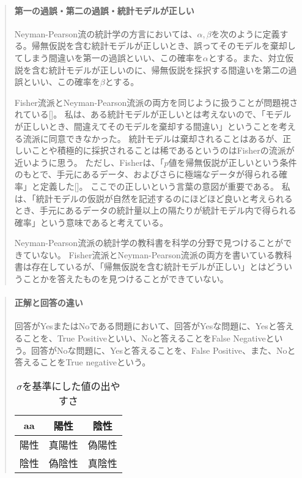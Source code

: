 \documentclass[a4paper,11pt,dvipdfmx]{jsarticle}
\begin{document}
\begin{mybox}
    \begin{quote}
    \paragraph{第一の過誤・第二の過誤・統計モデルが正しい}
        Neyman-Pearson流の統計学の方言においては、$\alpha,\beta$を次のように定義する。帰無仮説を含む統計モデルが正しいとき、誤ってそのモデルを棄却してしまう間違いを第一の過誤といい、この確率を$\alpha$とする。また、対立仮説を含む統計モデルが正しいのに、帰無仮説を採択する間違いを第二の過誤といい、この確率を$\beta$とする。

        Fisher流派とNeyman-Pearson流派の両方を同じように扱うことが問題視されている[\cite{published_papers/18436201}]。
        私は、ある統計モデルが正しいとは考えないので、「モデルが正しいとき、間違えてそのモデルを棄却する間違い」ということを考える流派に同意できなかった。
        統計モデルは棄却されることはあるが、正しいことや積極的に採択されることは稀であるというのはFisherの流派が近いように思う。
        ただし、Fisherは、「$p$値を帰無仮説が正しいという条件のもとで、手元にあるデータ、およびさらに極端なデータが得られる確率」と定義した[\cite{1573106361610039296}]。
        ここでの正しいという言葉の意図が重要である。
        私は、「統計モデルの仮説が自然を記述するのにほどほど良いと考えられるとき、手元にあるデータの統計量以上の隔たりが統計モデル内で得られる確率」という意味であると考えている。

        Neyman-Pearson流派の統計学の教科書を科学の分野で見つけることができていない。
        Fisher流派とNeyman-Pearson流派の両方を書いている教科書は存在しているが、「帰無仮説を含む統計モデルが正しい」とはどういうことかを答えたものを見つけることができていない。
    \end{quote}
\end{mybox}

\begin{mybox}
    \begin{quote}
    \paragraph{正解と回答の違い}
    回答がYesまたはNoである問題において、回答がYesな問題に、Yesと答えることを、True Positiveといい、Noと答えることをFalse Negativeという。回答がNoな問題に、Yesと答えることを、False Positive、また、Noと答えることをTrue negativeという。
    \begin{table}[hbtp]
        \caption{$\sigma$を基準にした値の出やすさ}
        \centering
        \begin{tabular}{ccc}
            \hline
            aa  & 陽性  &  陰性 \\
            \hline \hline
            陽性 & 真陽性 & 偽陽性  \\
            陰性 & 偽陰性 & 真陰性\\
        \end{tabular}
    \end{table}
    \fi
    \end{quote}
\end{mybox}
\end{document}

